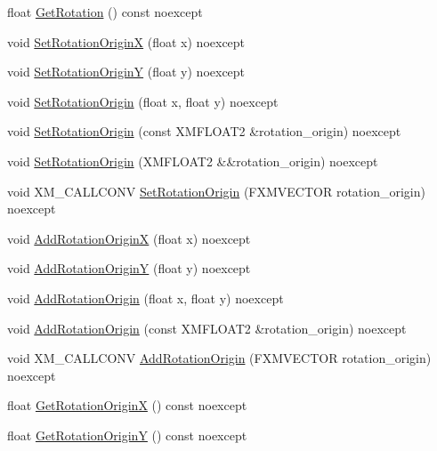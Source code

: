 \begin{DoxyCompactItemize}
\item 
float \hyperlink{structmage_1_1_sprite_transform_a2a89a583752a20fc61e8e13461781b44}{Get\+Rotation} () const noexcept
\item 
void \hyperlink{structmage_1_1_sprite_transform_a4fa6ea8d1c566ce4fed69a929a150322}{Set\+Rotation\+OriginX} (float x) noexcept
\item 
void \hyperlink{structmage_1_1_sprite_transform_a54222965d57b9a7438af2cdd93a7c881}{Set\+Rotation\+OriginY} (float y) noexcept
\item 
void \hyperlink{structmage_1_1_sprite_transform_a0610ecd1a5370a50470146cc47defab5}{Set\+Rotation\+Origin} (float x, float y) noexcept
\item 
void \hyperlink{structmage_1_1_sprite_transform_a93070ec524ff5828f8040c103dee41a4}{Set\+Rotation\+Origin} (const X\+M\+F\+L\+O\+A\+T2 \&rotation\+\_\+origin) noexcept
\item 
void \hyperlink{structmage_1_1_sprite_transform_a532771d53e650543d125ffb652671388}{Set\+Rotation\+Origin} (X\+M\+F\+L\+O\+A\+T2 \&\&rotation\+\_\+origin) noexcept
\item 
void X\+M\+\_\+\+C\+A\+L\+L\+C\+O\+NV \hyperlink{structmage_1_1_sprite_transform_acbb3eebc3fd26d616f5e4ca75a8c112b}{Set\+Rotation\+Origin} (F\+X\+M\+V\+E\+C\+T\+OR rotation\+\_\+origin) noexcept
\item 
void \hyperlink{structmage_1_1_sprite_transform_a2f3ad4009e58ba5b791d8aee2e4ee552}{Add\+Rotation\+OriginX} (float x) noexcept
\item 
void \hyperlink{structmage_1_1_sprite_transform_aaf69e555ed7c83865ff56c3e85879707}{Add\+Rotation\+OriginY} (float y) noexcept
\item 
void \hyperlink{structmage_1_1_sprite_transform_aeacf6d861af27156a3673ac7d340ce39}{Add\+Rotation\+Origin} (float x, float y) noexcept
\item 
void \hyperlink{structmage_1_1_sprite_transform_a540e9757575ce46edcfea9ea5dcac19b}{Add\+Rotation\+Origin} (const X\+M\+F\+L\+O\+A\+T2 \&rotation\+\_\+origin) noexcept
\item 
void X\+M\+\_\+\+C\+A\+L\+L\+C\+O\+NV \hyperlink{structmage_1_1_sprite_transform_a8f1ce16eb9c07a4f798e93bf58eb2b46}{Add\+Rotation\+Origin} (F\+X\+M\+V\+E\+C\+T\+OR rotation\+\_\+origin) noexcept
\item 
float \hyperlink{structmage_1_1_sprite_transform_ac38e5a279f2e7fc7fe27cdadd5454dc6}{Get\+Rotation\+OriginX} () const noexcept
\item 
float \hyperlink{structmage_1_1_sprite_transform_aacc0ac5e8d0ffd2206a28513a1532977}{Get\+Rotation\+OriginY} () const noexcept

\end{DoxyCompactItemize}
